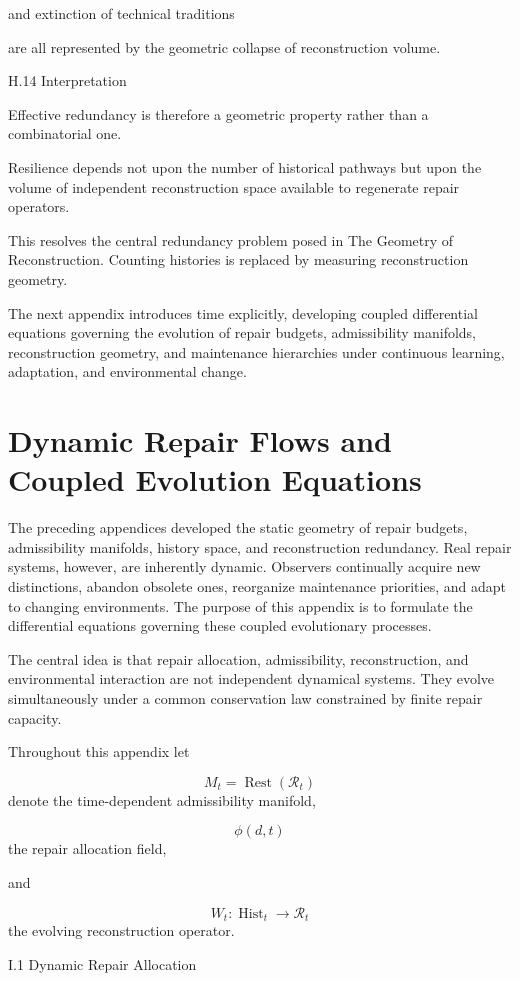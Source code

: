 \documentclass[12pt,oneside]{article}
\theoremstyle{plain}
\theoremstyle{definition}
\theoremstyle{remark}
\DeclareMathOperator{\Rest}{Rest}
\DeclareMathOperator{\Hist}{Hist}
\begin{document}
and extinction of technical traditions

are all represented by the geometric collapse of reconstruction volume.


H.14 Interpretation

Effective redundancy is therefore a geometric property rather than a combinatorial one.

Resilience depends not upon the number of historical pathways but upon the volume of independent reconstruction space available to regenerate repair operators.

This resolves the central redundancy problem posed in The Geometry of Reconstruction. Counting histories is replaced by measuring reconstruction geometry.

The next appendix introduces time explicitly, developing coupled differential equations governing the evolution of repair budgets, admissibility manifolds, reconstruction geometry, and maintenance hierarchies under continuous learning, adaptation, and environmental change.

\section{Dynamic Repair Flows and Coupled Evolution Equations}

The preceding appendices developed the static geometry of repair budgets, admissibility manifolds, history space, and reconstruction redundancy. Real repair systems, however, are inherently dynamic. Observers continually acquire new distinctions, abandon obsolete ones, reorganize maintenance priorities, and adapt to changing environments. The purpose of this appendix is to formulate the differential equations governing these coupled evolutionary processes.

The central idea is that repair allocation, admissibility, reconstruction, and environmental interaction are not independent dynamical systems. They evolve simultaneously under a common conservation law constrained by finite repair capacity.

Throughout this appendix let

\[
M_t=\Rest(\mathcal R_t)
\]
denote the time-dependent admissibility manifold,

\[
\phi(d,t)
\]
the repair allocation field,

and

\[
W_t:\Hist_t\rightarrow\mathcal R_t
\]
the evolving reconstruction operator.


I.1 Dynamic Repair Allocation
\end{document}
